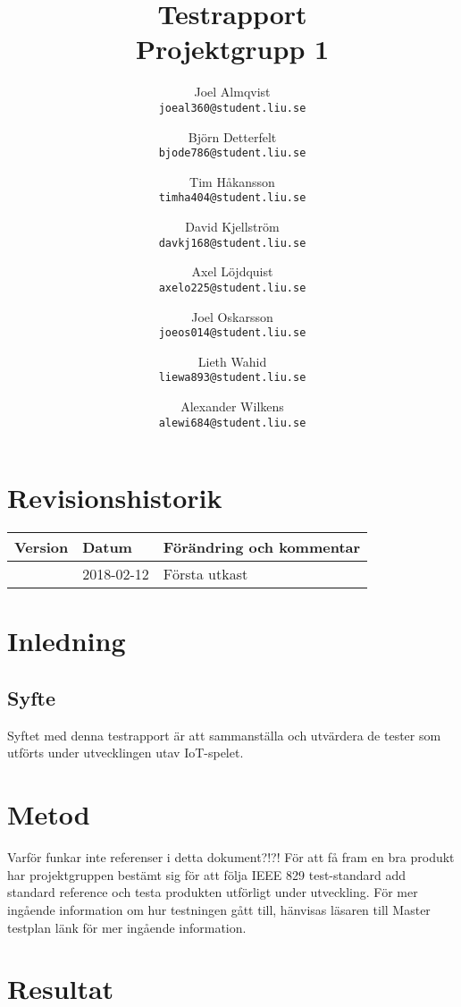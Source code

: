 \documentclass[10pt]{article}
\title{Testrapport\\
    \large Projektgrupp 1}
\author{
    Joel Almqvist\\
    \texttt{joeal360@student.liu.se}
    \and
    Björn Detterfelt\\
    \texttt{bjode786@student.liu.se}
    \and
    Tim Håkansson\\
    \texttt{timha404@student.liu.se}
    \and
    David Kjellström\\
    \texttt{davkj168@student.liu.se}
    \and
    Axel Löjdquist\\
    \texttt{axelo225@student.liu.se}
    \and
    Joel Oskarsson\\
    \texttt{joeos014@student.liu.se}
    \and
    Lieth Wahid\\
    \texttt{liewa893@student.liu.se}
    \and
    Alexander Wilkens\\
    \texttt{alewi684@student.liu.se}
}
\begin{document}



\maketitle
\pagebreak
	\section*{Revisionshistorik}

	
	\begin{center}
 	   \begin{tabular}{| l | l | p{12cm} |  }
 	       \hline
 	       \textbf{Version} & \textbf{Datum} & \textbf{Förändring och kommentar} \\
 	       \hline
 	       \centering 0.1 & 2018-02-12 & Första utkast\\
		\hline
 	   \end{tabular}
	\end{center}

	
	
\pagebreak
\tableofcontents
\pagebreak
{}

\section{Inledning}

\subsection{Syfte}
Syftet med denna testrapport är att sammanställa och utvärdera de tester som utförts under utvecklingen utav IoT-spelet. 
  

\section{Metod}
{\color{red}Varför funkar inte referenser i detta dokument?!?!} \cite{bib-projektplan} För att få fram en bra produkt har projektgruppen bestämt sig för att följa IEEE 829 test-standard {\color {red} add standard reference} och testa produkten utförligt under utveckling. För mer ingående information om hur testningen gått till, hänvisas läsaren till Master testplan {\color {red} länk} för mer ingående information.
\section{Resultat}
\end{document}

